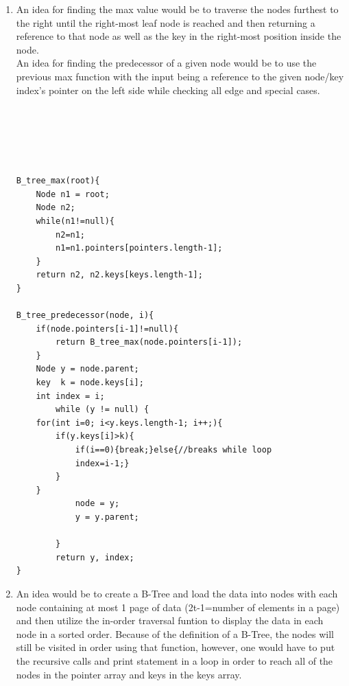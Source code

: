 \documentclass{article}
\begin{document}
\begin{enumerate}
\begin{minipage}[t]{\linewidth}
{         	 }
	\end{minipage}
\item An idea for finding the max value would be to traverse the nodes furthest to the right until the right-most leaf node is reached and then returning a reference to that node as well as
	the key in the right-most position inside the node.\\
	An idea for finding the predecessor of a given node would be to use the previous max function with the input being a reference to the given node/key index's pointer on the left
	 side while checking all edge and special cases. \\\\\\\\\\\\
	\begin{lstlisting}
B_tree_max(root){
	Node n1 = root;
	Node n2;
	while(n1!=null){
		n2=n1;
		n1=n1.pointers[pointers.length-1];
	}
	return n2, n2.keys[keys.length-1];
}

B_tree_predecessor(node, i){
	if(node.pointers[i-1]!=null){
		return B_tree_max(node.pointers[i-1]);
	}
	Node y = node.parent;
	key  k = node.keys[i];
	int index = i;
        while (y != null) {
	for(int i=0; i<y.keys.length-1; i++;){
		if(y.keys[i]>k){
			if(i==0){break;}else{//breaks while loop
			index=i-1;}
		}
	}
            node = y;
            y = y.parent;

        }
        return y, index;
}
	\end{lstlisting}
\item An idea would be to create a B-Tree and load the data into nodes with each node containing at most 1 page of data (2t-1=number of elements in a page) and then utilize the in-order
	traversal funtion to display the data in each node in a sorted order. Because of the definition of a B-Tree, the nodes will still be visited in order using that function, however, one
	would have to put the recursive calls and print statement in a loop in order to reach all of the nodes in the pointer array and keys in the keys array.
\end{enumerate}
\end{document}
